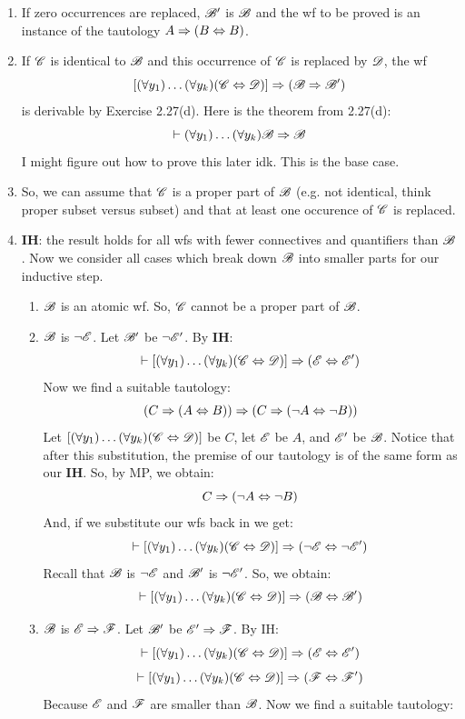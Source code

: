 \begin{enumerate}
    \item If zero occurrences are replaced, $\mathscr{B}'$ is $\mathscr{B}$ and the wf to be proved is an instance of the tautology $A \Rightarrow (B \Leftrightarrow B)$.
    \item If $\mathscr{C}$ is identical to $\mathscr{B}$ and this occurrence of $\mathscr{C}$ is replaced by $\mathscr{D}$, the wf \[[(\forall y_1)\dots(\forall y_k)(\mathscr{C} \Leftrightarrow \mathscr{D})] \Rightarrow (\mathscr{B} \Rightarrow \mathscr{B}')\] is derivable by Exercise 2.27(d). Here is the theorem from 2.27(d): \[\vdash (\forall y_1)\dots (\forall y_k) \mathscr{B} \Rightarrow \mathscr{B}\] I might figure out how to prove this later idk. This is the base case.
    \item So, we can assume that $\mathscr{C}$ is a proper part of $\mathscr{B}$ (e.g. not identical, think proper subset versus subset) and that at least one occurence of $\mathscr{C}$ is replaced.
    \item \textbf{IH}: the result holds for all wfs with fewer connectives and quantifiers than $\mathscr{B}$. Now we consider all cases which break down $\mathscr{B}$ into smaller parts for our inductive step.
    \begin{enumerate} [label = Case \arabic*., leftmargin=2\parindent]
        \item $\mathscr{B}$ is an atomic wf. So, $\mathscr{C}$ cannot be a proper part of  $\mathscr{B}$.
        \item $\mathscr{B}$ is $\lnot \mathscr{E}$. Let $\mathscr{B}'$ be $\lnot \mathscr{E} '$. By \textbf{IH}:
        \[\vdash [(\forall y_1) \dots (\forall y_k)(\mathscr{C} \Leftrightarrow \mathscr{D})] \Rightarrow (\mathscr{E} \Leftrightarrow \mathscr{E} ')\]
        Now we find a suitable tautology:
        \[(C \Rightarrow (A \Leftrightarrow B)) \Rightarrow (C \Rightarrow (\lnot A \Leftrightarrow \lnot B))\]
        Let $[(\forall y_1) \dots (\forall y_k)(\mathscr{C} \Leftrightarrow \mathscr{D})]$ be $C$, let $\mathscr{E}$ be $A$, and $\mathscr{E} '$ be $\mathscr{B}$. Notice that after this substitution, the premise of our tautology is of the same form as our \textbf{IH}. So, by MP, we obtain:
        \[C \Rightarrow (\lnot A \Leftrightarrow \lnot B)\]
        And, if we substitute our wfs back in we get:
        \[\vdash [(\forall y_1) \dots (\forall y_k)(\mathscr{C} \Leftrightarrow \mathscr{D})] \Rightarrow (\lnot \mathscr{E} \Leftrightarrow \lnot \mathscr{E} ')\]
        Recall that $\mathscr{B}$ is $\lnot \mathscr{E}$ and $\mathscr{B}'$ is $\lnot \mathscr{E} '$. So, we obtain:
        \[\vdash [(\forall y_1) \dots (\forall y_k)(\mathscr{C} \Leftrightarrow \mathscr{D})] \Rightarrow (\mathscr{B} \Leftrightarrow \mathscr{B}')\]
        \item $\mathscr{B}$ is $\mathscr{E} \Rightarrow \mathscr{F}$. Let $\mathscr{B}'$ be $\mathscr{E}' \Rightarrow \mathscr{F}$. By IH:
        \[\vdash [(\forall y_1) \dots (\forall y_k)(\mathscr{C} \Leftrightarrow \mathscr{D})] \Rightarrow (\mathscr{E} \Leftrightarrow \mathscr{E} ')\]
        \[\vdash [(\forall y_1) \dots (\forall y_k)(\mathscr{C} \Leftrightarrow \mathscr{D})] \Rightarrow (\mathscr{F} \Leftrightarrow \mathscr{F} ')\]
        Because $\mathscr{E}$ and $\mathscr{F}$ are smaller than $\mathscr{B}$. Now we find a suitable tautology:

\end{enumerate}
\end{enumerate}
